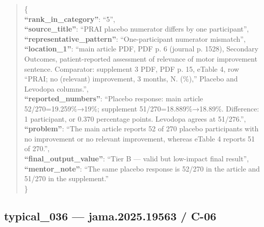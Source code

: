\documentclass[
  letterpaper,
  9pt]{extreport}
\begin{document}
\begin{quote}
\{\\
\textbf{``rank\_in\_category''}: ``5'',\\
\textbf{``source\_title''}: ``PRAI placebo numerator differs by one
participant'',\\
\textbf{``representative\_pattern''}: ``One-participant numerator
mismatch'',\\
\textbf{``location\_1''}: ``main article PDF, PDF p. 6 (journal p.
1528), Secondary Outcomes, patient-reported assessment of relevance of
motor improvement sentence. Comparator: supplement 3 PDF, PDF p. 15,
eTable 4, row ``PRAI; no (relevant) improvement, 3 months, N. (\%),''
Placebo and Levodopa columns.'',\\
\textbf{``reported\_numbers''}: ``Placebo response: main article
52/270=19.259\%→19\%; supplement 51/270=18.889\%→18.89\%. Difference: 1
participant, or 0.370 percentage points. Levodopa agrees at 51/276.'',\\
\textbf{``problem''}: ``The main article reports 52 of 270 placebo
participants with no improvement or no relevant improvement, whereas
eTable 4 reports 51 of 270.'',\\
\textbf{``final\_output\_value''}: ``Tier B --- valid but low-impact
final result'',\\
\textbf{``mentor\_note''}: ``The same placebo response is 52/270 in the
article and 51/270 in the supplement.''\\
\}
\end{quote}

\hypertarget{typical_036--jama202519563--c-06}{%
\subsection{typical\_036 --- jama.2025.19563 /
C-06}\label{typical_036--jama202519563--c-06}}
\end{document}

